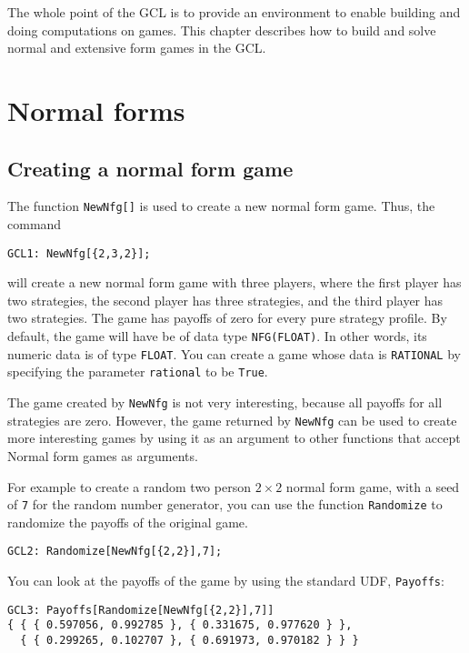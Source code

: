 The whole point of the GCL is to provide an environment to enable
building and doing computations on games.  This chapter describes how
to build and solve normal and extensive form games in the GCL.  

\section{Normal forms}

\subsection{Creating a normal form game}

The function \verb+NewNfg[]+ is used to create a new normal form game.
Thus, the command

\begin{verbatim}
GCL1: NewNfg[{2,3,2}];
\end{verbatim}

\noindent 
will create a new normal form game with three players, where the first
player has two strategies, the second player has three strategies, and
the third player has two strategies.  The game has payoffs of zero for
every pure strategy profile.  By default, the game will have be of
data type \verb+NFG(FLOAT)+.  In other words, its numeric data is of
type \verb+FLOAT+.  You can create a game whose data is
\verb+RATIONAL+ by specifying the parameter \verb+rational+ to be
\verb+True+.

The game created by \verb+NewNfg+ is not very interesting, because all
payoffs for all strategies are zero.  However, the game returned by
\verb+NewNfg+ can be used to create more interesting games by using it
as an argument to other functions that accept Normal form games as
arguments.

For example to create a random two person $2\times 2$ normal form
game, with a seed of \verb+7+ for the random number generator, you can
use the function \verb+Randomize+ to randomize the payoffs of the
original game.

\begin{verbatim}
GCL2: Randomize[NewNfg[{2,2}],7];
\end{verbatim}  

\noindent
You can look at the payoffs of the game by using the standard UDF,
\verb+Payoffs+:

\begin{verbatim}
GCL3: Payoffs[Randomize[NewNfg[{2,2}],7]]
{ { { 0.597056, 0.992785 }, { 0.331675, 0.977620 } },
  { { 0.299265, 0.102707 }, { 0.691973, 0.970182 } } }
\end{verbatim}  

